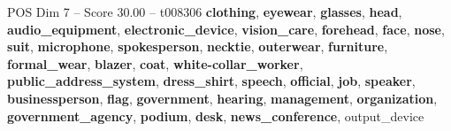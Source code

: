 \begin{textsample}{POS Dim 7 – Score 30.00 – t008306}  \label{ex:f7_pos_004}
\textbf{clothing}, \textbf{eyewear}, \textbf{glasses}, \textbf{head}, \textbf{audio\_equipment}, \textbf{electronic\_device}, \textbf{vision\_care}, \textbf{forehead}, \textbf{face}, \textbf{nose}, \textbf{suit}, \textbf{microphone}, \textbf{spokesperson}, \textbf{necktie}, \textbf{outerwear}, \textbf{furniture}, \textbf{formal\_wear}, \textbf{blazer}, \textbf{coat}, \textbf{white-collar\_worker}, \textbf{public\_address\_system}, \textbf{dress\_shirt}, \textbf{speech}, \textbf{official}, \textbf{job}, \textbf{speaker}, \textbf{businessperson}, \textbf{flag}, \textbf{government}, \textbf{hearing}, \textbf{management}, \textbf{organization}, \textbf{government\_agency}, \textbf{podium}, \textbf{desk}, \textbf{news\_conference}, output\_device

\end{textsample}

